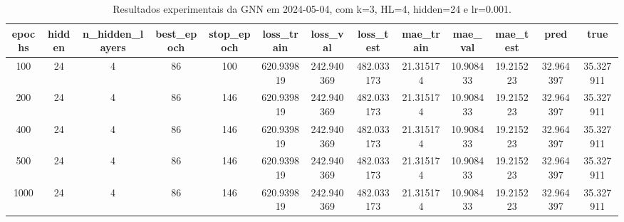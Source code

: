\begin{table}[h]
\centering
\caption{Resultados experimentais da GNN em 2024-05-04, com k=3, HL=4, hidden=24 e lr=0.001.}
\label{tab:gnn_results_k3_hl4_h24_d20240504}
\begin{tabular}{ccccccccccccc}
\toprule
epochs & hidden & n\_hidden\_layers & best\_epoch & stop\_epoch & loss\_train & loss\_val & loss\_test & mae\_train & mae\_val & mae\_test & pred & true \\
\midrule
100 & 24 & 4 & 86 & 100 & 620.939819 & 242.940369 & 482.033173 & 21.315174 & 10.908433 & 19.215223 & 32.964397 & 35.327911 \\
200 & 24 & 4 & 86 & 146 & 620.939819 & 242.940369 & 482.033173 & 21.315174 & 10.908433 & 19.215223 & 32.964397 & 35.327911 \\
400 & 24 & 4 & 86 & 146 & 620.939819 & 242.940369 & 482.033173 & 21.315174 & 10.908433 & 19.215223 & 32.964397 & 35.327911 \\
500 & 24 & 4 & 86 & 146 & 620.939819 & 242.940369 & 482.033173 & 21.315174 & 10.908433 & 19.215223 & 32.964397 & 35.327911 \\
1000 & 24 & 4 & 86 & 146 & 620.939819 & 242.940369 & 482.033173 & 21.315174 & 10.908433 & 19.215223 & 32.964397 & 35.327911 \\
\bottomrule
\end{tabular}
\end{table}

